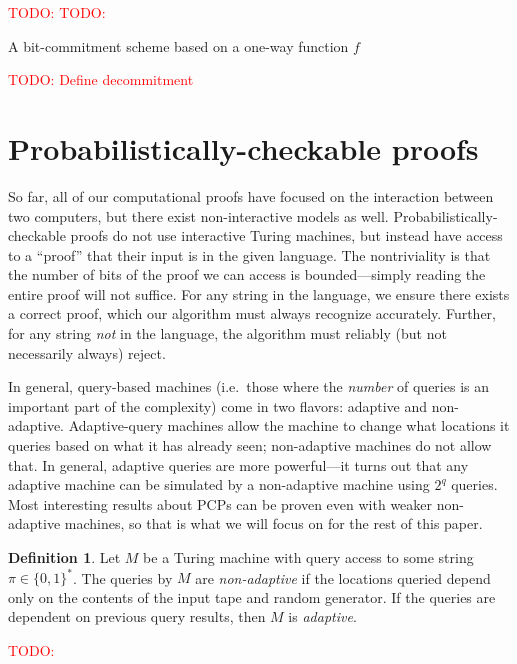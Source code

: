 \documentclass[english,12pt]{reedthesis}
\theoremstyle{plain}
\theoremstyle{definition}
\newtheorem{defn}[defn]{Definition}
\theoremstyle{remark}
\newcommand{\TODO}[1]{\textcolor{red}{TODO: #1}}
\begin{document}
\begin{algorithm}[htbp]
  \TODO{}\;
  \TODO{}\;
  \caption{A bit-commitment scheme based on a one-way function
    $f$}\label{alg:bit-commit}
\end{algorithm}

\TODO{Define decommitment}

\section{Probabilistically-checkable proofs}\label{sec:pcp}

So far, all of our computational proofs have focused on the interaction between
two computers, but there exist non-interactive models as well.
Probabilistically-checkable proofs do not use interactive Turing machines, but
instead have access to a ``proof'' that their input is in the given language.
The nontriviality is that the number of bits of the proof we can access is
bounded---simply reading the entire proof will not suffice. For any string in the
language, we ensure there exists a correct proof, which our algorithm must
always recognize accurately. Further, for any string \emph{not} in the language,
the algorithm must reliably (but not necessarily always) reject.

In general, query-based machines (i.e.\ those where the \emph{number} of queries
is an important part of the complexity) come in two flavors: adaptive and
non-adaptive. Adaptive-query machines allow the machine to change what locations
it queries based on what it has already seen; non-adaptive machines do not allow
that. In general, adaptive queries are more powerful---it turns out that any
adaptive machine can be simulated by a non-adaptive machine using $2^{q}$
queries. Most interesting results about PCPs can be proven even with weaker
non-adaptive machines, so that is what we will focus on for the rest of this
paper.

\begin{defn}\label{def:adaptive}
  Let $M$ be a Turing machine with query access to some string
  $\pi \in \{0, 1\}^{*}$. The queries by $M$ are \emph{non-adaptive} if the
  locations queried depend only on the contents of the input tape and random
  generator. If the queries are dependent on previous query results, then $M$ is
  \emph{adaptive}.
\end{defn}

\TODO{}
\end{document}
